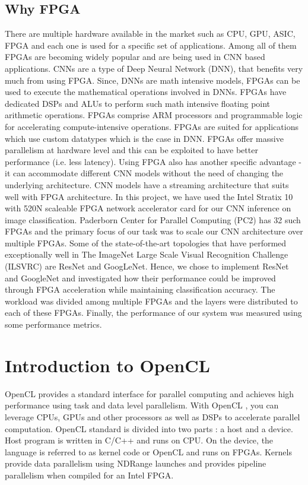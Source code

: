 \section{Why FPGA}
There are multiple hardware available in the market such as CPU, GPU, ASIC, FPGA and each one is used for a specific set of applications. Among all of them FPGAs are becoming widely popular and are being used in CNN based applications. CNNs are a type of Deep Neural Network (DNN), that benefits very much from using FPGA. Since, DNNs are math intensive models, FPGAs can be used to execute the mathematical operations involved in DNNs. FPGAs have dedicated DSPs and ALUs to perform such math intensive floating point arithmetic operations. FPGAs comprise ARM processors and programmable logic for accelerating compute-intensive operations. FPGAs are suited for applications which use custom datatypes which is the case in DNN. FPGAs offer massive parallelism at hardware level and this can be exploited to have better performance (i.e. less latency). Using FPGA also has another specific advantage - it can accommodate different CNN models without the need of changing the underlying architecture. CNN models have a streaming architecture that suits well with FPGA architecture.
In this project, we have used the Intel Stratix 10 with 520N scaleable FPGA network accelerator card for our CNN inference on image classification. Paderborn Center for Parallel Computing (PC2) has 32 such FPGAs and the primary focus of our task was to scale our CNN architecture over multiple FPGAs.
Some of the state-of-the-art topologies that have performed exceptionally well in The ImageNet Large Scale Visual Recognition Challenge (ILSVRC) are ResNet and GoogLeNet. Hence, we chose to implement ResNet and GoogleNet and investigated how their performance could be improved through FPGA acceleration while maintaining classification accuracy.
The workload was divided among multiple FPGAs and the layers were distributed to each of these FPGAs. Finally, the performance of our system was measured using some performance metrics.

\chapter{Introduction to OpenCL}
OpenCL provides a standard interface for parallel computing and achieves high performance using task and data level parallelism. With OpenCL , you can leverage CPUs, GPUs and other processors as well as DSPs to accelerate parallel computation. OpenCL standard is divided into two parts : a host and a device. Host program is written in C/C++ and runs on CPU. On the device, the language is referred to as kernel code or OpenCL and runs on FPGAs. Kernels provide data parallelism using NDRange launches and provides pipeline parallelism when compiled for an Intel FPGA.
